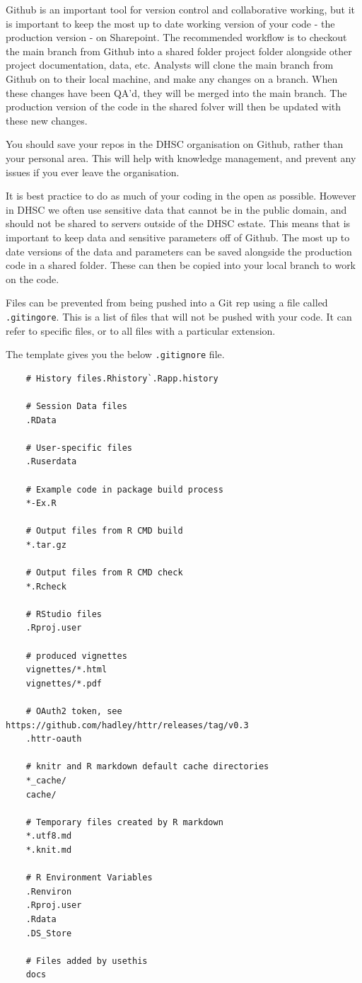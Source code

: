 \documentclass[
  letterpaper,
]{book}
\begin{document}
Github is an important tool for version control and collaborative
working, but it is important to keep the most up to date working version
of your code - the production version - on Sharepoint. The recommended
workflow is to checkout the main branch from Github into a shared folder
project folder alongside other project documentation, data, etc.
Analysts will clone the main branch from Github on to their local
machine, and make any changes on a branch. When these changes have been
QA'd, they will be merged into the main branch. The production version
of the code in the shared folver will then be updated with these new
changes.

You should save your repos in the DHSC organisation on Github, rather
than your personal area. This will help with knowledge management, and
prevent any issues if you ever leave the organisation.

It is best practice to do as much of your coding in the open as
possible. However in DHSC we often use sensitive data that cannot be in
the public domain, and should not be shared to servers outside of the
DHSC estate. This means that is important to keep data and sensitive
parameters off of Github. The most up to date versions of the data and
parameters can be saved alongside the production code in a shared
folder. These can then be copied into your local branch to work on the
code.

Files can be prevented from being pushed into a Git rep using a file
called \texttt{.gitingore}. This is a list of files that will not be
pushed with your code. It can refer to specific files, or to all files
with a particular extension.

The template gives you the below \texttt{.gitignore} file.

\begin{verbatim}
    # History files.Rhistory`.Rapp.history

    # Session Data files
    .RData

    # User-specific files
    .Ruserdata

    # Example code in package build process
    *-Ex.R

    # Output files from R CMD build
    *.tar.gz

    # Output files from R CMD check
    *.Rcheck

    # RStudio files
    .Rproj.user

    # produced vignettes
    vignettes/*.html
    vignettes/*.pdf

    # OAuth2 token, see https://github.com/hadley/httr/releases/tag/v0.3
    .httr-oauth

    # knitr and R markdown default cache directories
    *_cache/
    cache/

    # Temporary files created by R markdown
    *.utf8.md
    *.knit.md

    # R Environment Variables
    .Renviron
    .Rproj.user
    .Rdata
    .DS_Store

    # Files added by usethis
    docs
    
    
\end{verbatim}
\end{document}
